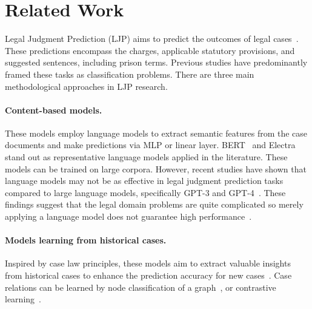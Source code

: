 \section{Related Work} \label{rw}


Legal Judgment Prediction (LJP) aims to predict the outcomes of legal cases~\cite{chalkidis-etal-2019-neural, an-etal-2022-charge}. These predictions encompass the charges, applicable statutory provisions, and suggested sentences, including prison terms. Previous studies have predominantly framed these tasks as classification problems. There are three main methodological approaches in LJP research.

\paragraph{Content-based models.} 
These models employ language models to extract semantic features from the case documents and make predictions via MLP or linear layer. BERT~\cite{devlin-etal-2019-bert} and Electra~\cite{DBLP:conf/iclr/ClarkLLM20} stand out as representative language models applied in the literature. These models can be trained on large corpora. However, recent studies have shown that language models may not be as effective in legal judgment prediction tasks compared to large language models, specifically GPT-3 and GPT-4~\cite{shui-etal-2023-comprehensive, wu-etal-2023-precedent}. These findings suggest that the legal domain problems are quite complicated so merely applying a language model does not guarantee high performance~\cite{vats-etal-2023-llms}.

\paragraph{Models learning from historical cases.} 
Inspired by case law principles, these models aim to extract valuable insights from historical cases to enhance the prediction accuracy for new cases~\cite{DBLP:conf/cicai/ZhouLWKZW22}. Case relations can be learned by node classification of a graph~\cite{Rformer}, or contrastive learning~\cite{liu-etal-2022-augmenting}. 

